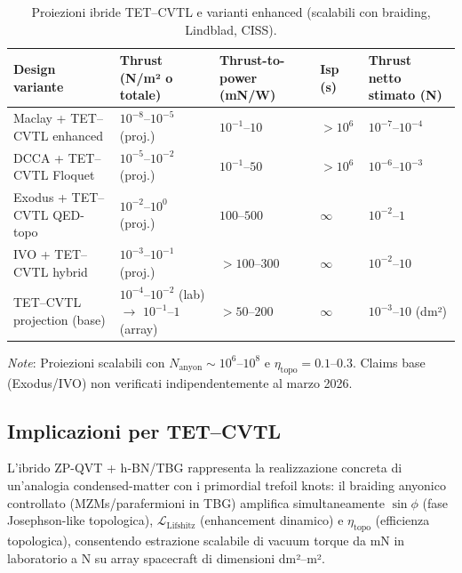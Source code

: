 \documentclass[11pt,a4paper]{article}
\theoremstyle{plain}
\theoremstyle{definition}
\begin{document}
\begin{table}[H]
\centering
\caption{Proiezioni ibride TET–CVTL e varianti enhanced (scalabili con braiding, Lindblad, CISS).}
\small
\arrayrulewidth=0.8pt
\begin{tabularx}{\textwidth}{
  | >{\raggedright\arraybackslash}p{5.5cm}   %
  | >{\centering\arraybackslash}X             %
  | >{\centering\arraybackslash}X             %
  | >{\centering\arraybackslash}X             %
  | >{\centering\arraybackslash}X  |           %
}
\hline
\textbf{Design variante} & \textbf{Thrust (N/m² o totale)} & \textbf{Thrust-to-power (mN/W)} & \textbf{Isp (s)} & \textbf{Thrust netto stimato (N)} \\
\hline
Maclay + TET–CVTL enhanced & $10^{-8}$--$10^{-5}$ (proj.) & $10^{-1}$--$10$ & $>10^6$ & $10^{-7}$--$10^{-4}$ \\
DCCA + TET–CVTL Floquet & $10^{-5}$--$10^{-2}$ (proj.) & $10^{-1}$--$50$ & $>10^6$ & $10^{-6}$--$10^{-3}$ \\
Exodus + TET–CVTL QED-topo & $10^{-2}$--$10^{0}$ (proj.) & $100$--$500$ & $\infty$ & $10^{-2}$--$1$ \\
IVO + TET–CVTL hybrid & $10^{-3}$--$10^{-1}$ (proj.) & $>100$--$300$ & $\infty$ & $10^{-2}$--$10$ \\
TET–CVTL projection (base) & $10^{-4}$--$10^{-2}$ (lab) $\to$ $10^{-1}$--$1$ (array) & $>50$--$200$ & $\infty$ & $10^{-3}$--$10$ (dm²) \\
\hline
\end{tabularx}
\vspace{0.8em}

\vspace{0.2cm}

{\small 
\textit{Note}: Proiezioni scalabili con $N_{\mathrm{anyon}} \sim 10^6$--$10^8$ e $\eta_{\mathrm{topo}} = 0.1$--$0.3$. Claims base (Exodus/IVO) non verificati indipendentemente al marzo 2026.
}
\label{tab:thruster-comparative-tet-cvtl}
\end{table}


\vspace{0.4cm}


\subsection{Implicazioni per TET--CVTL}

L'ibrido ZP-QVT + h-BN/TBG rappresenta la realizzazione concreta di un'analogia condensed-matter con i primordial trefoil knots: il braiding anyonico controllato (MZMs/parafermioni in TBG) amplifica simultaneamente $\sin\phi$ (fase Josephson-like topologica), $\mathcal{L}_{\mathrm{Lifshitz}}$ (enhancement dinamico) e $\eta_{\mathrm{topo}}$ (efficienza topologica), consentendo estrazione scalabile di vacuum torque da mN in laboratorio a N su array spacecraft di dimensioni dm²–m².
\end{document}
